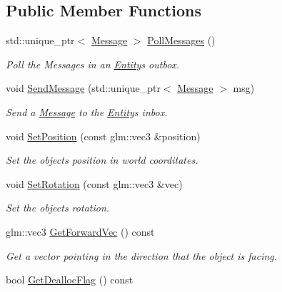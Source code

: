 \subsection*{Public Member Functions}
\begin{DoxyCompactItemize}
\item 
std\+::unique\+\_\+ptr$<$ \hyperlink{class_f_l_i_g_h_t_1_1_message}{Message} $>$ \hyperlink{class_f_l_i_g_h_t_1_1_entity_a34a22386784cea5c79c9b1e4930b3223}{Poll\+Messages} ()
\begin{DoxyCompactList}\small\item\em Poll the Messages in an \hyperlink{class_f_l_i_g_h_t_1_1_entity}{Entity}\textquotesingle{}s outbox. \end{DoxyCompactList}\item 
void \hyperlink{class_f_l_i_g_h_t_1_1_entity_a99b530391d784811e89df71bcecdf61a}{Send\+Message} (std\+::unique\+\_\+ptr$<$ \hyperlink{class_f_l_i_g_h_t_1_1_message}{Message} $>$ msg)
\begin{DoxyCompactList}\small\item\em Send a \hyperlink{class_f_l_i_g_h_t_1_1_message}{Message} to the \hyperlink{class_f_l_i_g_h_t_1_1_entity}{Entity}\textquotesingle{}s inbox. \end{DoxyCompactList}\item 
void \hyperlink{class_f_l_i_g_h_t_1_1_entity_a9e99ebb85e0046e474420a3c843e4f45}{Set\+Position} (const glm\+::vec3 \&position)
\begin{DoxyCompactList}\small\item\em Set the object\textquotesingle{}s position in world coorditates. \end{DoxyCompactList}\item 
void \hyperlink{class_f_l_i_g_h_t_1_1_entity_acae0369a4dfcc8c4d147d218eacb7423}{Set\+Rotation} (const glm\+::vec3 \&vec)
\begin{DoxyCompactList}\small\item\em Set the object\textquotesingle{}s rotation. \end{DoxyCompactList}\item 
glm\+::vec3 \hyperlink{class_f_l_i_g_h_t_1_1_entity_a5c4655be394d009657705f6300e7663c}{Get\+Forward\+Vec} () const
\begin{DoxyCompactList}\small\item\em Get a vector pointing in the direction that the object is facing. \end{DoxyCompactList}\item 
bool \hyperlink{class_f_l_i_g_h_t_1_1_entity_a00a100b26af24e3929fa898208606557}{Get\+Dealloc\+Flag} () const

\end{DoxyCompactItemize}
